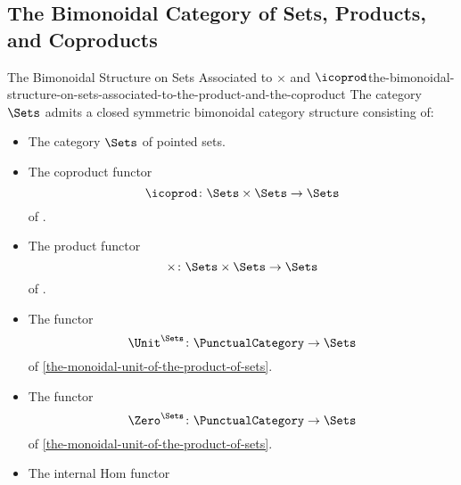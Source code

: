 \subsection{The Bimonoidal Category of Sets, Products, and Coproducts}\label{subsection-the-bimonoidal-category-of-sets-products-and-coproducts}
\begin{proposition}{The Bimonoidal Structure on Sets Associated to $\times$ and $\icoprod$}{the-bimonoidal-structure-on-sets-associated-to-the-product-and-the-coproduct}%
    The category $\Sets$ admits a closed symmetric bimonoidal category structure consisting of:%
    \begin{itemize}
        \item{}The category $\Sets$ of pointed sets.
        \item{}The coproduct functor
            \[
                \icoprod%
                \colon%
                \Sets\times\Sets%
                \to%
                \Sets
            \]%
            of .
        \item{}The product functor
            \[
                \times%
                \colon%
                \Sets\times\Sets%
                \to%
                \Sets
            \]%
            of .
        \item{}The functor
            \[
                \Unit^{\Sets}
                \colon
                \PunctualCategory
                \to
                \Sets
            \]
            of \cref{the-monoidal-unit-of-the-product-of-sets}.
        \item{}The functor
            \[
                \Zero^{\Sets}
                \colon
                \PunctualCategory
                \to
                \Sets
            \]
            of \cref{the-monoidal-unit-of-the-product-of-sets}.
        \item{}The internal Hom functor

\end{itemize}
\end{proposition}
